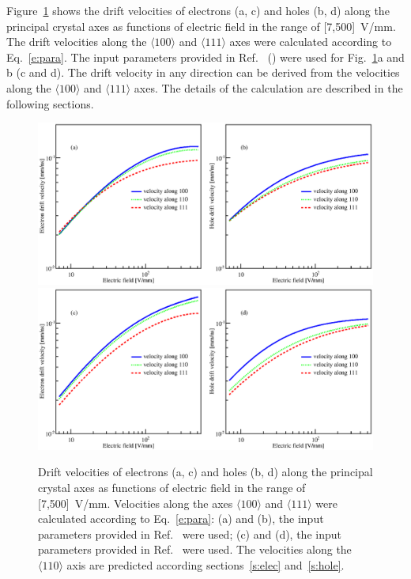 \documentclass[epj]{svjour}
\begin{document}
Figure~\ref{f:vvse} shows the drift velocities of electrons (a, c) and
holes (b, d) along the principal crystal axes as functions of electric
field in the range of [7,500]~V/mm. The drift velocities along the
$\langle 100 \rangle$ and $\langle 111 \rangle$ axes were calculated
according to Eq.~\ref{e:para}. The input parameters provided in
Ref.~\cite{miha} (\cite{bart}) were used for Fig.~\ref{f:vvse}a and b
(c and d).  The drift velocity in any direction can be derived from
the velocities along the $\langle 100 \rangle$ and $\langle 111
\rangle$ axes.  The details of the calculation are described in the
following sections.
 
\begin{figure}\centering
\includegraphics[width=0.8\linewidth]{VvsElucian} 
\includegraphics[width=0.8\linewidth]{VvsEbart} 
\caption{Drift velocities of electrons (a, c) and holes (b, d) along
the principal crystal axes as functions of electric field in the range
of [7,500]~V/mm. Velocities along the axes $\langle 100 \rangle$ and
$\langle 111 \rangle$ were calculated according to Eq.~\ref{e:para}:
(a) and (b), the input parameters provided in Ref.~\cite{miha} were
used; (c) and (d), the input parameters provided in Ref.~\cite{bart}
were used. The velocities along the $\langle 110 \rangle$ axis are
predicted according sections~\ref{s:elec} and~\ref{s:hole}.}
\label{f:vvse} 
\end{figure} 
 
\end{document}
